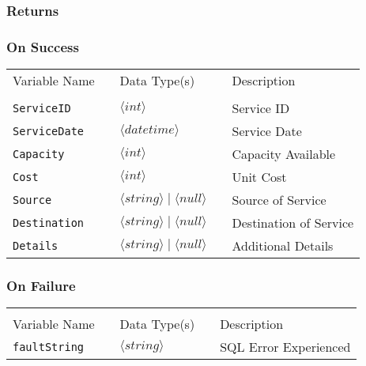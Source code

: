 \subsubsection{Returns}

\subsubsection{On Success}

\begin{tabular}{lllll}
Variable Name	&		&	Data Type(s)		&	&	Description	\\
				&	&	&	&	\\
\verb!ServiceID! & \hspace{15mm} & $\langle int\rangle $ & \hspace{15mm} & Service ID \\
\verb!ServiceDate! & \hspace{15mm} & $\langle datetime\rangle $ & \hspace{15mm} & Service Date \\
\verb!Capacity! & \hspace{15mm} & $\langle int\rangle $ & \hspace{15mm} & Capacity Available \\
\verb!Cost! & \hspace{15mm} & $\langle int\rangle $ & \hspace{15mm} & Unit Cost \\
\verb!Source! & \hspace{15mm} & $\langle string\rangle  \mid \langle null\rangle $ & \hspace{15mm} & Source of Service \\
\verb!Destination! & \hspace{15mm} & $\langle string\rangle  \mid  \langle null\rangle $ & \hspace{15mm} & Destination of Service \\
\verb!Details! & \hspace{15mm} & $\langle string\rangle  \mid \langle null\rangle $ & \hspace{15mm} & Additional Details \\
\end{tabular}
\subsubsection{On Failure}

\begin{tabular}{lllll}
				&	&	&	&	\\
Variable Name	&		&	Data Type(s)		&	&	Description	\\
\verb!faultString! & \hspace{15mm} & $\langle string\rangle $ & \hspace{15mm} & SQL Error Experienced \\
\end{tabular}



